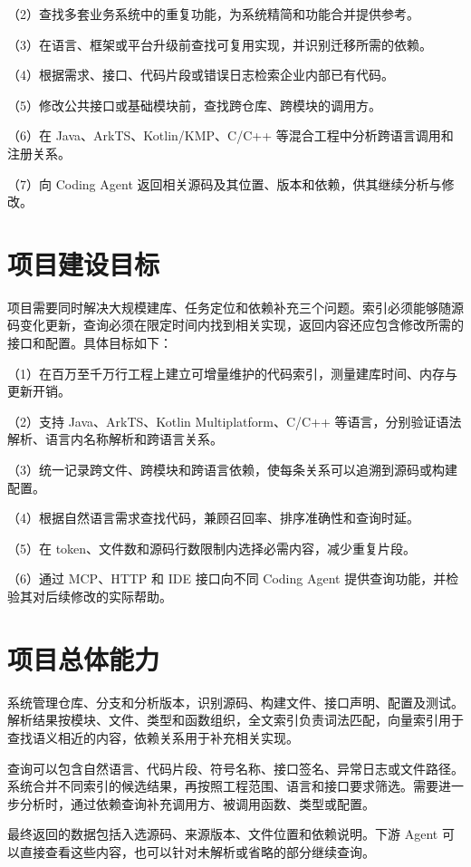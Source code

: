 （2）查找多套业务系统中的重复功能，为系统精简和功能合并提供参考。

（3）在语言、框架或平台升级前查找可复用实现，并识别迁移所需的依赖。

（4）根据需求、接口、代码片段或错误日志检索企业内部已有代码。

（5）修改公共接口或基础模块前，查找跨仓库、跨模块的调用方。

（6）在 Java、ArkTS、Kotlin/KMP、C/C++ 等混合工程中分析跨语言调用和注册关系。

（7）向 Coding Agent 返回相关源码及其位置、版本和依赖，供其继续分析与修改。

\section{项目建设目标}

项目需要同时解决大规模建库、任务定位和依赖补充三个问题。索引必须能够随源码变化更新，查询必须在限定时间内找到相关实现，返回内容还应包含修改所需的接口和配置。具体目标如下：

（1）在百万至千万行工程上建立可增量维护的代码索引，测量建库时间、内存与更新开销。

（2）支持 Java、ArkTS、Kotlin Multiplatform、C/C++ 等语言，分别验证语法解析、语言内名称解析和跨语言关系。

（3）统一记录跨文件、跨模块和跨语言依赖，使每条关系可以追溯到源码或构建配置。

（4）根据自然语言需求查找代码，兼顾召回率、排序准确性和查询时延。

（5）在 token、文件数和源码行数限制内选择必需内容，减少重复片段。

（6）通过 MCP、HTTP 和 IDE 接口向不同 Coding Agent 提供查询功能，并检验其对后续修改的实际帮助。

\section{项目总体能力}

系统管理仓库、分支和分析版本，识别源码、构建文件、接口声明、配置及测试。解析结果按模块、文件、类型和函数组织，全文索引负责词法匹配，向量索引用于查找语义相近的内容，依赖关系用于补充相关实现。

查询可以包含自然语言、代码片段、符号名称、接口签名、异常日志或文件路径。系统合并不同索引的候选结果，再按照工程范围、语言和接口要求筛选。需要进一步分析时，通过依赖查询补充调用方、被调用函数、类型或配置。

最终返回的数据包括入选源码、来源版本、文件位置和依赖说明。下游 Agent 可以直接查看这些内容，也可以针对未解析或省略的部分继续查询。

